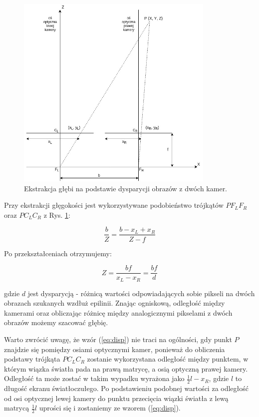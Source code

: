 \documentclass[oneside, eng]{mgr}
\begin{document}
\begin{figure}
	\centering
	\includegraphics[width=9.5cm]{ekstrakcja.jpg}
	\caption{Ekstrakcja głębi na podstawie dysparycji obrazów z dwóch kamer. }
	\label{fig:extraction}
\end{figure}

Przy ekstrakcji głęgokości jest wykorzystywane podobieństwo trójkątów $P F_L F_R$ oraz $P C_L C_R$ z Rys. \ref{fig:extraction}:

\begin{equation}
	\frac{b}{Z} = \frac{b-x_L+x_R}{Z-f}
	\label{eq:disp}
\end{equation}

Po przekształceniach otrzymujemy:

\begin{equation}
	Z = \frac{bf}{x_L-x_R} = \frac{bf}{d}
\end{equation}

gdzie $d$ jest dysparycją - różnicą wartości odpowiadających sobie pikseli na dwóch obrazach szukanych wzdłuż epilinii.
Znając ogniskową, odległość między kamerami oraz obliczając różnicę między analogicznymi pikselami z dwóch obrazów możemy szacować głębię.

Warto zwrócić uwagę, że wzór (\ref{eq:disp}) nie traci na ogólności, gdy punkt $P$ znajdzie się pomiędzy osiami optycznymi kamer, ponieważ do obliczenia podstawy trójkąta $P C_L C_R$ zostanie wykorzystana odległość między punktem, w którym wiązka światła pada na prawą matrycę, a osią optyczną prawej kamery. Odległość ta może zostać w takim wypadku wyrażona jako $\frac{1}{2}l-x_R$, gdzie $l$ to długość ekranu światłoczułego. Po podstawieniu podobnej wartości za odległość od osi optycznej lewej kamery do punktu przecięcia wiązki światła z lewą matrycą $\frac{1}{2}l$ uprości się i zostaniemy ze wzorem (\ref{eq:disp}).
\end{document}
